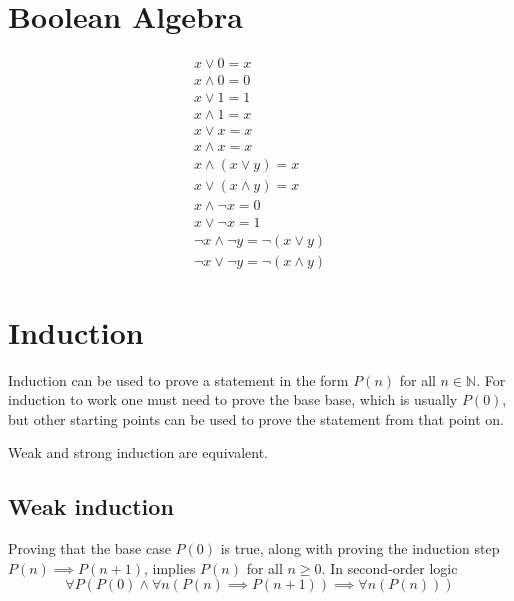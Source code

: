 \documentclass[a4paper]{article}
\author{Paolo Bettelini}
\date{}
\begin{document}
\maketitle
\tableofcontents
\pagebreak

\section{Boolean Algebra}


\begin{align*}
    x \lor 0 = x \\
    x \land 0 = 0 \\
    x \lor 1 = 1 \\
    x \land 1 = x \\
    x \lor x = x \\
    x \land x = x \\
    x \land (x \lor y) = x \\
    x \lor (x \land y) = x \\
    x \land \lnot x = 0 \\
    x \lor \lnot x = 1 \\
    \lnot x \land \lnot y = \lnot (x \lor y) \\
    \lnot x \lor \lnot y = \lnot (x \land y)
\end{align*}

\pagebreak

\section{Induction}

Induction can be used to prove a statement in the form \(P(n)\)
for all \(n \in \mathbb{N}\).
For induction to work one must need to prove the base base, which is usually \(P(0)\),
but other starting points can be used to prove the statement from that point on.

Weak and strong induction are equivalent.

\subsection{Weak induction}

Proving that the base case \(P(0)\) is true,
along with proving the induction step \(P(n) \implies P(n+1)\), implies \(P(n)\)
for all \(n \geq 0\). In second-order logic
\[
    \forall P \left(
        P(0) \land \forall n \left( P(n) \implies P(n+1) \right)
        \implies \forall n \left( P(n) \right)
    \right)
\]
\end{document}
